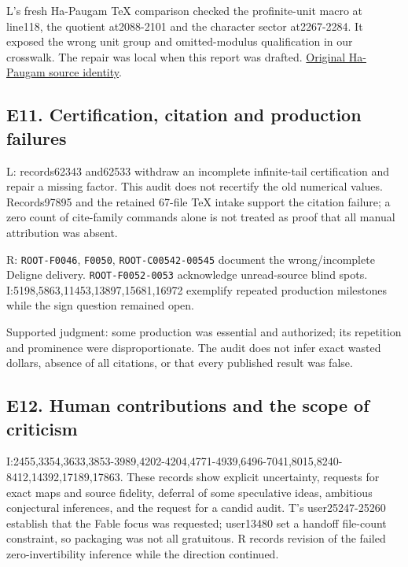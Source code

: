 \documentclass[
  british,
  11pt,
  a4paper,
]{article}
\begin{document}
L's fresh Ha-Paugam TeX comparison checked the profinite-unit macro at
line118, the quotient at2088-2101 and the character sector at2267-2284.
It exposed the wrong unit group and omitted-modulus qualification in our
crosswalk. The repair was local when this report was drafted.
\href{https://arxiv.org/abs/math/0507101v1}{Original Ha-Paugam source
identity}.

\subsection{E11. Certification, citation and production
failures}\label{e11.-certification-citation-and-production-failures}

L: records62343 and62533 withdraw an incomplete infinite-tail
certification and repair a missing factor. This audit does not recertify
the old numerical values. Records97895 and the retained 67-file TeX
intake support the citation failure; a zero count of cite-family
commands alone is not treated as proof that all manual attribution was
absent.

R: \texttt{ROOT-F0046}, \texttt{F0050}, \texttt{ROOT-C00542-00545}
document the wrong/incomplete Deligne delivery. \texttt{ROOT-F0052-0053}
acknowledge unread-source blind spots.
I:5198,5863,11453,13897,15681,16972 exemplify repeated production
milestones while the sign question remained open.

Supported judgment: some production was essential and authorized; its
repetition and prominence were disproportionate. The audit does not
infer exact wasted dollars, absence of all citations, or that every
published result was false.

\subsection{E12. Human contributions and the scope of
criticism}\label{e12.-human-contributions-and-the-scope-of-criticism}

I:2455,3354,3633,3853-3989,4202-4204,4771-4939,6496-7041,8015,8240-8412,14392,17189,17863.
These records show explicit uncertainty, requests for exact maps and
source fidelity, deferral of some speculative ideas, ambitious
conjectural inferences, and the request for a candid audit. T's
user25247-25260 establish that the Fable focus was requested; user13480
set a handoff file-count constraint, so packaging was not all
gratuitous. R records revision of the failed zero-invertibility
inference while the direction continued.
\end{document}
